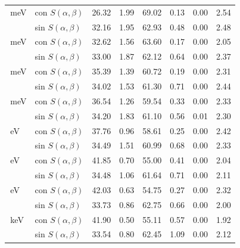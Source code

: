\begin{longtable}{llrrrrrr}
\addlinespace[2pt]
100\,meV & con $S(\alpha,\beta)$ & 26.32 & 1.99 & 69.02 & 0.13 & 0.00 & 2.54 \\
 & sin $S(\alpha,\beta)$ & 32.16 & 1.95 & 62.93 & 0.48 & 0.00 & 2.48 \\
\addlinespace[2pt]
300\,meV & con $S(\alpha,\beta)$ & 32.62 & 1.56 & 63.60 & 0.17 & 0.00 & 2.05 \\
 & sin $S(\alpha,\beta)$ & 33.00 & 1.87 & 62.12 & 0.64 & 0.00 & 2.37 \\
\addlinespace[2pt]
500\,meV & con $S(\alpha,\beta)$ & 35.39 & 1.39 & 60.72 & 0.19 & 0.00 & 2.31 \\
 & sin $S(\alpha,\beta)$ & 34.02 & 1.53 & 61.30 & 0.71 & 0.00 & 2.44 \\
\addlinespace[2pt]
700\,meV & con $S(\alpha,\beta)$ & 36.54 & 1.26 & 59.54 & 0.33 & 0.00 & 2.33 \\
 & sin $S(\alpha,\beta)$ & 34.20 & 1.83 & 61.10 & 0.56 & 0.01 & 2.30 \\
\addlinespace[2pt]
1\,eV & con $S(\alpha,\beta)$ & 37.76 & 0.96 & 58.61 & 0.25 & 0.00 & 2.42 \\
 & sin $S(\alpha,\beta)$ & 34.49 & 1.51 & 60.99 & 0.68 & 0.00 & 2.33 \\
\addlinespace[2pt]
10\,eV & con $S(\alpha,\beta)$ & 41.85 & 0.70 & 55.00 & 0.41 & 0.00 & 2.04 \\
 & sin $S(\alpha,\beta)$ & 34.48 & 1.06 & 61.64 & 0.71 & 0.00 & 2.11 \\
\addlinespace[2pt]
100\,eV & con $S(\alpha,\beta)$ & 42.03 & 0.63 & 54.75 & 0.27 & 0.00 & 2.32 \\
 & sin $S(\alpha,\beta)$ & 33.73 & 0.86 & 62.75 & 0.66 & 0.00 & 2.00 \\
\addlinespace[2pt]
1\,keV & con $S(\alpha,\beta)$ & 41.90 & 0.50 & 55.11 & 0.57 & 0.00 & 1.92 \\
 & sin $S(\alpha,\beta)$ & 33.54 & 0.80 & 62.45 & 1.09 & 0.00 & 2.12 \\
\bottomrule
\end{longtable}
